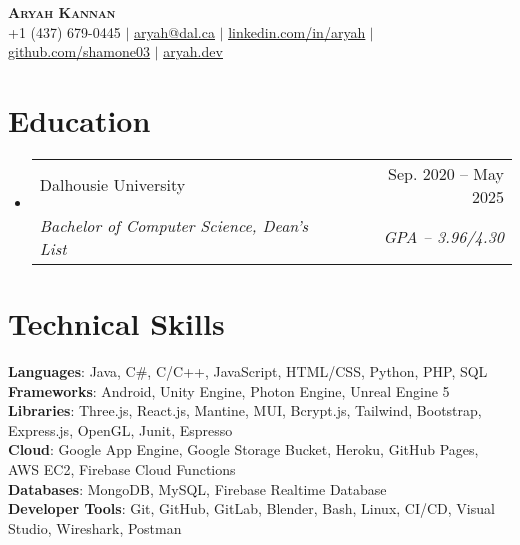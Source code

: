 \documentclass[letterpaper,11pt]{article}
\makeatletter
\newcommand{\resumeSubheading}[4]{
  \vspace{-2pt}\item
    \begin{tabular*}{0.97\textwidth}[t]{l@{\extracolsep{\fill}}r}
      #1 & #2 \\
      \textit{\small#3} & \textit{\small #4} \\
    \end{tabular*}\vspace{-7pt}
}
\newcommand{\resumeSubHeadingListStart}{\begin{itemize}[leftmargin=0.15in, label={}]}
\newcommand{\resumeSubHeadingListEnd}{\end{itemize}}
\makeatother
\begin{document}

\begin{center}
    \textbf{\Huge \scshape Aryah Kannan} \\ \vspace{1pt}
    \small +1 (437) 679-0445 $|$ \href{mailto:aryah@dal.ca}{\underline{aryah@dal.ca}} $|$ 
    \href{https://www.linkedin.com/in/aryahkannan/}{\underline{linkedin.com/in/aryah}} $|$
    \href{https://github.com/shamone03}{\underline{github.com/shamone03}} $|$
    \href{https://aryah.dev}{\underline{aryah.dev}}
\end{center}


\section{Education}
  \resumeSubHeadingListStart
    \resumeSubheading
      {Dalhousie University}{Sep. 2020 -- May 2025}
      {Bachelor of Computer Science, Dean's List}{GPA -- 3.96/4.30}
  \resumeSubHeadingListEnd
  
\section{Technical Skills}
 \begin{itemize}[leftmargin=0.15in, label={}]
    \small{\item{
     \textbf{Languages}{: Java, C\#, C/C++, JavaScript, HTML/CSS,  Python, PHP, SQL} \\
     \textbf{Frameworks}{: Android, Unity Engine, Photon Engine, Unreal Engine 5} \\
     \textbf{Libraries}{: Three.js, React.js, Mantine, MUI, Bcrypt.js, Tailwind, Bootstrap, Express.js, OpenGL, Junit, Espresso} \\
     \textbf{Cloud}{: Google App Engine, Google Storage Bucket, Heroku, GitHub Pages, AWS EC2, Firebase Cloud Functions} \\
     \textbf{Databases}{: MongoDB, MySQL, Firebase Realtime Database} \\
     \textbf{Developer Tools}{: Git, GitHub, GitLab, Blender, Bash, Linux, CI/CD, Visual Studio, Wireshark, Postman} \\
     
    }}
 \end{itemize}
\end{document}
